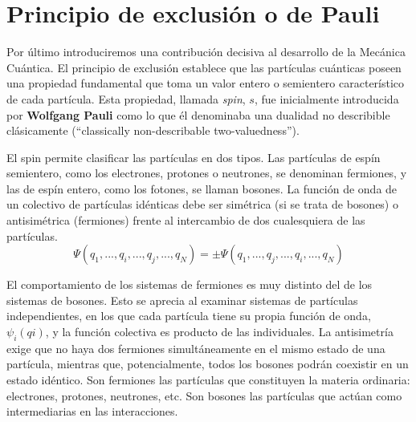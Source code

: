 \section{Principio de exclusión o de Pauli}
Por último introduciremos una contribución decisiva
al desarrollo de la Mecánica Cuántica. El principio de
exclusión establece que las partículas cuánticas poseen una 
propiedad fundamental que toma un valor entero o semientero 
característico de cada partícula. Esta propiedad, 
llamada \textit{spin}, $s$, fue inicialmente introducida
por \textbf{Wolfgang Pauli} como lo que él denominaba una
dualidad no
describible clásicamente (``classically non-describable
two-valuedness'').

El spin permite clasificar las partículas en dos tipos.
Las partículas de espín semientero, como los electrones,
protones o neutrones, 
se denominan fermiones, y las de espín entero, como los
fotones, se llaman bosones. La función de onda de un 
colectivo de partículas idénticas debe ser simétrica 
(si se trata de bosones) o antisimétrica (fermiones) 
frente al intercambio de dos cualesquiera de las partículas.
\begin{equation}
    \Psi(q_1, ..., q_i, ..., q_j, ..., q_N)=\pm 
    \Psi(q_1, ..., q_j, ..., q_i, ..., q_N)
\end{equation}

El comportamiento de los sistemas de fermiones es muy 
distinto del de los sistemas de bosones. Esto se aprecia
al examinar sistemas de partículas independientes, en los
que cada partícula tiene su propia función de onda,
$\psi_i(qi)$, y la función colectiva es producto de las
individuales. La antisimetría exige que no haya dos 
fermiones simultáneamente en el mismo estado de una 
partícula, mientras que, potencialmente, todos los bosones
podrán coexistir en un estado idéntico.
Son fermiones las partículas que constituyen la materia
ordinaria: electrones, protones, neutrones, etc. Son 
bosones las partículas que actúan como intermediarias 
en las interacciones.





